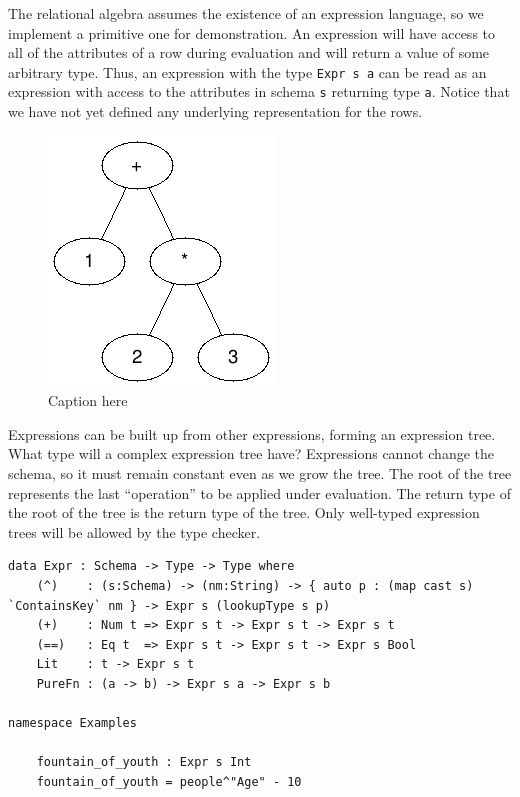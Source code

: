 \documentclass[12pt]{article}
\begin{document}
The relational algebra assumes the existence of an expression language, so we implement a primitive one for demonstration.
An expression will have access to all of the attributes of a row during evaluation and will return a value of some arbitrary type.
Thus, an expression with the type \texttt{Expr s a} can be read as an expression with access to the attributes in schema \texttt{s} returning type \texttt{a}.
Notice that we have not yet defined any underlying representation for the rows.

\begin{figure}[tb]
    \centering
    \includegraphics[]{assets/expr_tree.png}
    \caption{Caption here}
    \label{fig:figure1}
\end{figure}

Expressions can be built up from other expressions, forming an expression tree.
What type will a complex expression tree have?
Expressions cannot change the schema, so it must remain constant even as we grow the tree.
The root of the tree represents the last ``operation'' to be applied under evaluation.
The return type of the root of the tree is the return type of the tree.
Only well-typed expression trees will be allowed by the type checker.

\begin{lstlisting}
data Expr : Schema -> Type -> Type where
    (^)    : (s:Schema) -> (nm:String) -> { auto p : (map cast s) `ContainsKey` nm } -> Expr s (lookupType s p)
    (+)    : Num t => Expr s t -> Expr s t -> Expr s t
    (==)   : Eq t  => Expr s t -> Expr s t -> Expr s Bool
    Lit    : t -> Expr s t
    PureFn : (a -> b) -> Expr s a -> Expr s b

namespace Examples

    fountain_of_youth : Expr s Int
    fountain_of_youth = people^"Age" - 10
\end{lstlisting}
\end{document}
